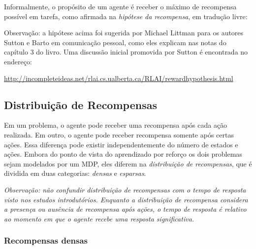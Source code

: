 \documentclass{article}
\begin{document}
            Informalmente, o propósito de um agente é receber o máximo de recompensa possível em tarefa, como afirmada na \emph{hipótese da recompensa}, em tradução livre:
            \begin{center}
            \noindent{}%
            \end{center}
            
            Observação: a hipótese acima foi sugerida por Michael Littman para os autores Sutton e Barto em comunicação pessoal, como eles explicam nas notas do capítulo 3 do livro. Uma discussão inicial promovida por Sutton é encontrada no endereço:
            
            \url{http://incompleteideas.net/rlai.cs.ualberta.ca/RLAI/rewardhypothesis.html}
            
        \subsection{Distribuição de Recompensas}

            Em um problema, o agente pode receber uma recompensa após cada ação realizada. Em outro, o agente pode receber recompensa somente após certas ações. Essa diferença pode existir independentemente do número de estados e ações. Embora do ponto de vista do aprendizado por reforço os dois problemas sejam modelados por um MDP, eles diferem na \emph{distribuição de recompensas}, que é dividida em duas categorias: \emph{densas} e \emph{esparsas}.
        
            \emph{Observação: não confundir distribuição de recompensas com o tempo de resposta visto nos estudos introdutórios. Enquanto a distribuição de recompensa considera a presença ou ausência de recompensa após ações, o tempo de resposta é relativo ao momento em que o agente recebe uma resposta significativa.}

            \subsubsection{Recompensas densas}
                
\end{document}

